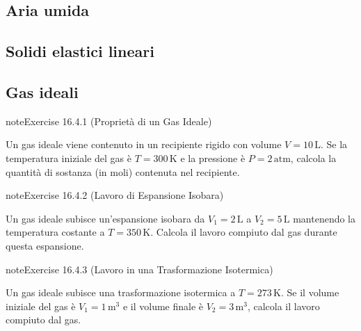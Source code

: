 \documentclass[letterpaper,10pt,italian]{jupyterBook}
\begin{document}
\subsection{Aria umida}
\label{\detokenize{ch/thermodynamics/matter-problems:aria-umida}}

\subsection{Solidi elastici lineari}
\label{\detokenize{ch/thermodynamics/matter-problems:solidi-elastici-lineari}}

\subsection{Gas ideali}
\label{\detokenize{ch/thermodynamics/matter-problems:id1}} \label{exercise:ch/thermodynamics/matter-problems-exercise-0}

\begin{sphinxadmonition}{note}{Exercise 16.4.1 (Proprietà di un Gas Ideale)}



\sphinxAtStartPar
Un gas ideale viene contenuto in un recipiente rigido con volume \(V = 10 \, \text{L}\). Se la temperatura iniziale del gas è \(T = 300 \, \text{K}\) e la pressione è \(P = 2 \, \text{atm}\), calcola la quantità di sostanza (in moli) contenuta nel recipiente.
\end{sphinxadmonition}
 \label{exercise:ch/thermodynamics/matter-problems-exercise-1}

\begin{sphinxadmonition}{note}{Exercise 16.4.2 (Lavoro di Espansione Isobara)}



\sphinxAtStartPar
Un gas ideale subisce un’espansione isobara da \(V_1 = 2 \, \text{L}\) a \(V_2 = 5 \, \text{L}\) mantenendo la temperatura costante a \(T = 350 \, \text{K}\). Calcola il lavoro compiuto dal gas durante questa espansione.
\end{sphinxadmonition}
 \label{exercise:ch/thermodynamics/matter-problems-exercise-2}

\begin{sphinxadmonition}{note}{Exercise 16.4.3 (Lavoro in una Trasformazione Isotermica)}



\sphinxAtStartPar
Un gas ideale subisce una trasformazione isotermica a \(T = 273 \, \text{K}\). Se il volume iniziale del gas è \(V_1 = 1 \, \text{m}^3\) e il volume finale è \(V_2 = 3 \, \text{m}^3\), calcola il lavoro compiuto dal gas.
\end{sphinxadmonition}
 \label{exercise:ch/thermodynamics/matter-problems-exercise-3}
\end{document}
